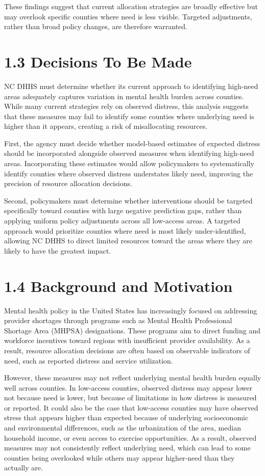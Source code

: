 \documentclass[11pt]{article}
\begin{document}
These findings suggest that current allocation strategies are broadly effective but may overlook specific counties where need is less visible. Targeted adjustments, rather than broad policy changes, are therefore warranted.

\section*{1.3 Decisions To Be Made}

NC DHHS must determine whether its current approach to identifying high-need areas adequately captures variation in mental health burden across counties. While many current strategies rely on observed distress, this analysis suggests that these measures may fail to identify some counties where underlying need is higher than it appears, creating a risk of misallocating resources. 

First, the agency must decide whether model-based estimates of expected distress should be incorporated alongside observed measures when identifying high-need areas. Incorporating these estimates would allow policymakers to systematically identify counties where observed distress understates likely need, improving the precision of resource allocation decisions. 

Second, policymakers must determine whether interventions should be targeted specifically toward counties with large negative prediction gaps, rather than applying uniform policy adjustments across all low-access areas. A targeted approach would prioritize counties where need is most likely under-identified, allowing NC DHHS to direct limited resources toward the areas where they are likely to have the greatest impact. 

\section*{1.4 Background and Motivation}

Mental health policy in the United States has increasingly focused on addressing provider shortages through programs such as Mental Health Professional Shortage Area (MHPSA) designations. These programs aim to direct funding and workforce incentives toward regions with insufficient provider availability. As a result, resource allocation decisions are often based on observable indicators of need, such as reported distress and service utilization. 

However, these measures may not reflect underlying mental health burden equally well across counties. In low-access counties, observed distress may appear lower not because need is lower, but because of limitations in how distress is measured or reported. It could also be the case that low-access counties may have observed stress that appears higher than expected because of underlying socioeconomic and environmental differences, such as the urbanization of the area, median household income, or even access to exercise opportunities. As a result, observed measures may not consistently reflect underlying need, which can lead to some counties being overlooked while others may appear higher-need than they actually are. 
\end{document}
